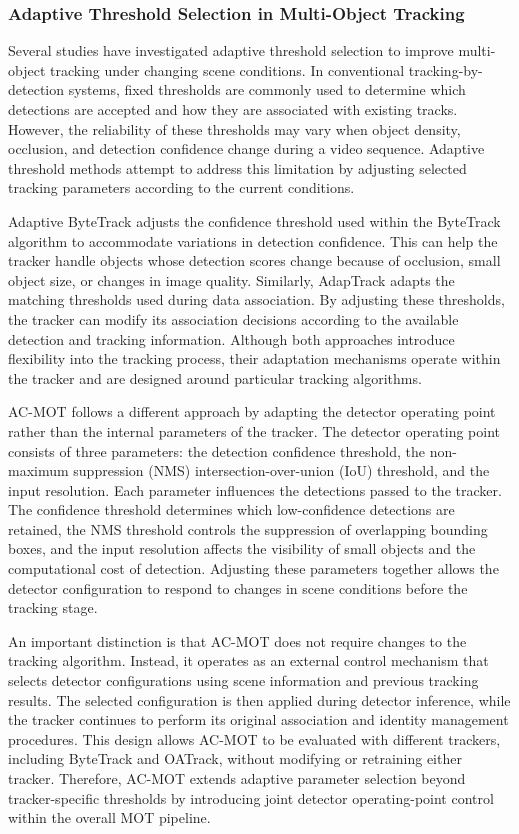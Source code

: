 \documentclass[pdflatex,sn-mathphys-num,iicol]{sn-jnl}
\begin{document}
\subsubsection{Adaptive Threshold Selection in Multi-Object Tracking}
Several studies have investigated adaptive threshold selection to improve multi-object tracking under changing scene conditions. In conventional tracking-by-detection systems, fixed thresholds are commonly used to determine which detections are accepted and how they are associated with existing tracks. However, the reliability of these thresholds may vary when object density, occlusion, and detection confidence change during a video sequence. Adaptive threshold methods attempt to address this limitation by adjusting selected tracking parameters according to the current conditions.

Adaptive ByteTrack adjusts the confidence threshold used within the ByteTrack \cite{ma2023adaptivebytetrack} algorithm to accommodate variations in detection confidence. This can help the tracker handle objects whose detection scores change because of occlusion, small object size, or changes in image quality. Similarly, AdapTrack \cite{shim2024adaptrack} adapts the matching thresholds used during data association. By adjusting these thresholds, the tracker can modify its association decisions according to the available detection and tracking information. Although both approaches introduce flexibility into the tracking process, their adaptation mechanisms operate within the tracker and are designed around particular tracking algorithms.

AC-MOT follows a different approach by adapting the detector operating point rather than the internal parameters of the tracker. The detector operating point consists of three parameters: the detection confidence threshold, the non-maximum suppression (NMS) intersection-over-union (IoU) threshold, and the input resolution. Each parameter influences the detections passed to the tracker. The confidence threshold determines which low-confidence detections are retained, the NMS threshold controls the suppression of overlapping bounding boxes, and the input resolution affects the visibility of small objects and the computational cost of detection. Adjusting these parameters together allows the detector configuration to respond to changes in scene conditions before the tracking stage.

An important distinction is that AC-MOT does not require changes to the tracking algorithm. Instead, it operates as an external control mechanism that selects detector configurations using scene information and previous tracking results. The selected configuration is then applied during detector inference, while the tracker continues to perform its original association and identity management procedures. This design allows AC-MOT to be evaluated with different trackers, including ByteTrack and OATrack, without modifying or retraining either tracker. Therefore, AC-MOT extends adaptive parameter selection beyond tracker-specific thresholds by introducing joint detector operating-point control within the overall MOT pipeline.
\end{document}
